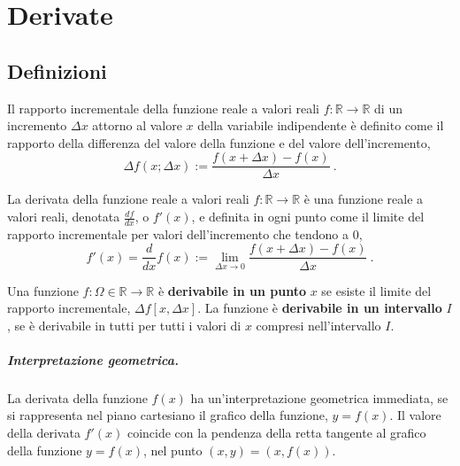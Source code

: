 \chapter{Derivate}\label{ch:derivatives}

\section{Definizioni}
\begin{definition} Il rapporto incrementale della funzione reale a valori reali $f: \mathbb{R} \rightarrow \mathbb{R}$ di un incremento $\Delta x$ attorno al valore $x$ della variabile indipendente è definito come il rapporto della differenza del valore della funzione e del valore dell'incremento,
\begin{equation}
    \Delta f (x; \Delta x) := \dfrac{f(x+\Delta x) - f(x)}{\Delta x} \ .
\end{equation}
\end{definition}

\begin{definition}[Derivata]\label{def:derivative}
La derivata della funzione reale a valori reali $f: \mathbb{R} \rightarrow \mathbb{R}$ è una funzione reale a valori reali, denotata $\frac{d f}{dx}$, o $f'(x)$, e definita in ogni punto come il limite del rapporto incrementale per valori dell'incremento che tendono a $0$,
\begin{equation}
  f'(x) = \dfrac{d }{dx} f(x) := \lim_{\Delta x \rightarrow 0} \dfrac{f(x+\Delta x) - f(x)}{\Delta x} \ .
\end{equation}
\end{definition}

\begin{definition}\label{def:differentiable-fcn} Una funzione $f: \Omega \in \mathbb{R} \rightarrow \mathbb{R}$ è \textbf{derivabile in un punto} $x$ se esiste il limite del rapporto incrementale, $\Delta f[x, \Delta x]$. La funzione è \textbf{derivabile in un intervallo} $I$, se è derivabile in tutti per tutti i valori di $x$ compresi nell'intervallo $I$.
\end{definition}

\paragraph{Interpretazione geometrica.}
La derivata della funzione $f(x)$ ha un'interpretazione geometrica immediata, se si rappresenta nel piano cartesiano il grafico della funzione, $y = f(x)$. Il valore della derivata $f'(x)$ coincide con la pendenza della retta tangente al grafico della funzione $y = f(x)$, nel punto $(x,y) = (x, f(x))$.

